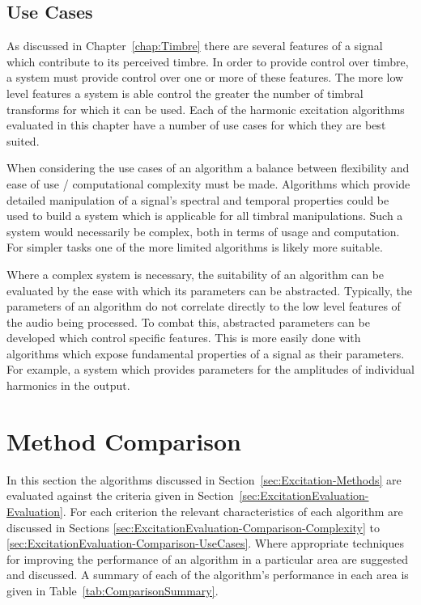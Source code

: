 	\subsection{Use Cases}
	\label{sec:ExcitationEvaluation-Evaluation-UseCases}
		As discussed in Chapter~\ref{chap:Timbre} there are several features of a signal which contribute to its
		perceived timbre. In order to provide control over timbre, a system must provide control over one or more
		of these features. The more low level features a system is able control the greater the number of timbral
		transforms for which it can be used. Each of the harmonic excitation algorithms evaluated in this chapter
		have a number of use cases for which they are best suited.
		
		When considering the use cases of an algorithm a balance between flexibility and ease of use /
		computational complexity must be made. Algorithms which provide detailed manipulation of a signal's
		spectral and temporal properties could be used to build a system which is applicable for all timbral
		manipulations. Such a system would necessarily be complex, both in terms of usage and computation. For
		simpler tasks one of the more limited algorithms is likely more suitable.
		
		Where a complex system is necessary, the suitability of an algorithm can be evaluated by the ease with
		which its parameters can be abstracted. Typically, the parameters of an algorithm do not correlate directly
		to the low level features of the audio being processed. To combat this, abstracted parameters can be
		developed which control specific features. This is more easily done with algorithms which expose
		fundamental properties of a signal as their parameters. For example, a system which provides parameters
		for the amplitudes of individual harmonics in the output.

\section{Method Comparison}
\label{sec:ExcitationEvaluation-Comparison}
	In this section the algorithms discussed in Section~\ref{sec:Excitation-Methods} are evaluated against the criteria
	given in Section~\ref{sec:ExcitationEvaluation-Evaluation}. For each criterion the relevant characteristics of each
	algorithm are discussed in Sections \ref{sec:ExcitationEvaluation-Comparison-Complexity} to
	\ref{sec:ExcitationEvaluation-Comparison-UseCases}. Where appropriate techniques for improving the performance of
	an algorithm in a particular area are suggested and discussed. A summary of each of the algorithm's performance in
	each area is given in Table~\ref{tab:ComparisonSummary}.

